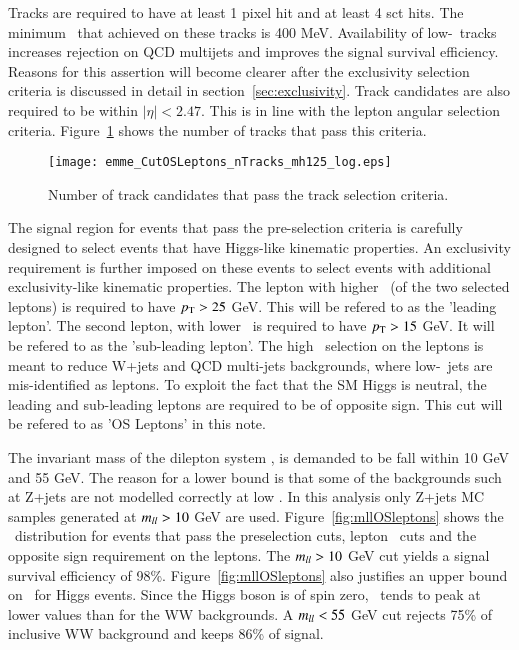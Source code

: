 \par Tracks are required to have at least 1 pixel hit and at least 4 sct hits. The minimum \pt\ 
that achieved on these tracks is 400 MeV. Availability of low-\pt\ tracks increases rejection on
QCD multijets and improves the signal survival efficiency. Reasons for this assertion will become 
clearer after the exclusivity selection criteria is discussed in detail in section~\ref{sec:exclusivity}.  
 Track candidates are also required to be within $|\eta|<2.47$. This is in line with the lepton angular 
selection criteria. Figure~\ref{fig:nTracks} shows the number of tracks that pass this criteria. 

\begin{figure}[!h]
\centering
	\texttt{[image: emme\_CutOSLeptons\_nTracks\_mh125\_log.eps]}\\
\caption{Number of track candidates that pass the track selection criteria.}
\label{fig:nTracks}
\end{figure}

\par The signal region for events that pass the pre-selection criteria is carefully 
designed to select events that have Higgs-like kinematic properties. 
An exclusivity requirement is further imposed on these events to select events with additional exclusivity-like kinematic properties.
The lepton with higher \pt\ (of the two selected leptons) is required to have $p_{\mathrm{T}}>25$ GeV. This will be refered to as the 'leading 
lepton'. The second lepton, with lower \pt\ is required to have $p_{\mathrm{T}}>15$ GeV. It will 
be refered to as the 'sub-leading lepton'. The high \pt\ selection on the leptons  is 
meant to reduce W+jets and QCD multi-jets backgrounds, where low-\pt\ jets are 
mis-identified as leptons. To exploit the fact that the SM Higgs is neutral, the 
leading and sub-leading leptons are required to be of opposite sign. This cut will be refered to 
as 'OS Leptons' in this note. 
\par The invariant mass of the dilepton system \mll, is demanded to 
be fall within 10 GeV and 55 GeV. The reason for a lower bound is that 
some of the backgrounds such at Z+jets are not modelled correctly at low \mll. In this analysis
only Z+jets MC samples generated at $m_{ll}>10$ GeV are used. Figure~\ref{fig:mllOSleptons}
shows the \mll\ distribution for events that pass the preselection cuts, lepton \pt\ cuts
and the opposite sign requirement on the leptons. The $m_{ll}>10$ GeV cut yields a 
signal survival efficiency of 98\%. Figure~\ref{fig:mllOSleptons} also justifies an upper bound on 
\mll\ for Higgs events. Since the Higgs boson is of spin zero, \mll\ tends to peak at lower
 values than for the WW backgrounds. A $m_{ll}<55$ GeV cut rejects 75\% of inclusive WW background 
and keeps 86\% of signal. 

